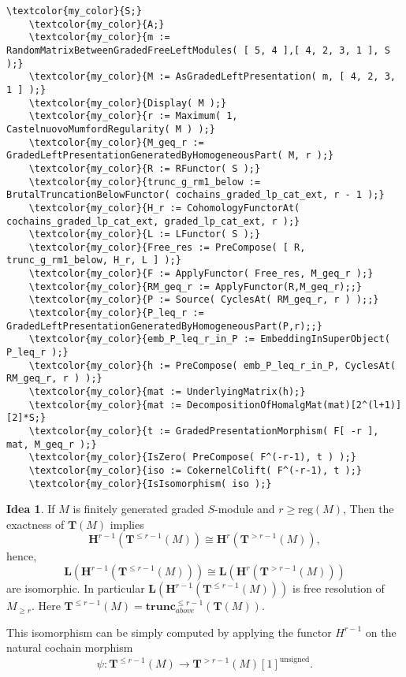 \documentclass[16pt,a4paper]{extarticle}
\theoremstyle{definition}
\newtheorem{idea}{Idea}
\theoremstyle{theorem}
\newcommand{\LL}{\mathbf{L}}
\newcommand{\HH}{\mathbf{H}}
\newcommand{\TT}{\mathbf{T}}
\newcommand{\trunc}{\mathbf{trunc}}
\begin{document}
\begin{Verbatim}[commandchars=\\\{\}, fontseries=b, frame=single, label=Gap Code, framerule=0.5mm, rulecolor=\color{rule_color}]
    \textcolor{my_color}{S;}
    \textcolor{my_color}{A;}
    \textcolor{my_color}{m := RandomMatrixBetweenGradedFreeLeftModules( [ 5, 4 ],[ 4, 2, 3, 1 ], S );}
    \textcolor{my_color}{M := AsGradedLeftPresentation( m, [ 4, 2, 3, 1 ] );}
    \textcolor{my_color}{Display( M );}
    \textcolor{my_color}{r := Maximum( 1, CastelnuovoMumfordRegularity( M ) );}
    \textcolor{my_color}{M_geq_r := GradedLeftPresentationGeneratedByHomogeneousPart( M, r );}
    \textcolor{my_color}{R := RFunctor( S );}
    \textcolor{my_color}{trunc_g_rm1_below := BrutalTruncationBelowFunctor( cochains_graded_lp_cat_ext, r - 1 );}
    \textcolor{my_color}{H_r := CohomologyFunctorAt( cochains_graded_lp_cat_ext, graded_lp_cat_ext, r );}
    \textcolor{my_color}{L := LFunctor( S );}
    \textcolor{my_color}{Free_res := PreCompose( [ R, trunc_g_rm1_below, H_r, L ] );}
    \textcolor{my_color}{F := ApplyFunctor( Free_res, M_geq_r );}
    \textcolor{my_color}{RM_geq_r := ApplyFunctor(R,M_geq_r);;}
    \textcolor{my_color}{P := Source( CyclesAt( RM_geq_r, r ) );;}
    \textcolor{my_color}{P_leq_r := GradedLeftPresentationGeneratedByHomogeneousPart(P,r);;}
    \textcolor{my_color}{emb_P_leq_r_in_P := EmbeddingInSuperObject( P_leq_r );}
    \textcolor{my_color}{h := PreCompose( emb_P_leq_r_in_P, CyclesAt( RM_geq_r, r ) );}
    \textcolor{my_color}{mat := UnderlyingMatrix(h);}
    \textcolor{my_color}{mat := DecompositionOfHomalgMat(mat)[2^(l+1)][2]*S;}
    \textcolor{my_color}{t := GradedPresentationMorphism( F[ -r ], mat, M_geq_r );}
    \textcolor{my_color}{IsZero( PreCompose( F^(-r-1), t ) );}
    \textcolor{my_color}{iso := CokernelColift( F^(-r-1), t );}
    \textcolor{my_color}{IsIsomorphism( iso );}
\end{Verbatim}
    
\begin{idea}
    If $M$ is finitely generated graded $S$-module and $r\geq\mathrm{reg}(M)$, Then the exactness of $\TT(M)$ implies
    $$\HH^{r-1}( \TT^{\leq r-1}(M)) \cong \HH^r( \TT^{> r-1}(M)),$$ hence, 
    $$\LL(\HH^{r-1}( \TT^{\leq r-1}(M)) ) \cong  \LL(\HH^r( \TT^{> r-1}(M)) )$$ are isomorphic. In particular 
    $\LL(\HH^{r-1}( \TT^{\leq r-1}(M)) )$ is free resolution of $M_{\geq r}$.
    Here $\TT^{\leq r-1}(M) = \trunc^{\leq r-1}_{above}(\TT(M))$.

    This isomorphism can be simply computed by applying the functor $H^{r-1}$ on the 
    natural cochain morphism 
    $$\psi: \TT^{\leq r-1}(M)\rightarrow \TT^{> r-1}(M)[1]^{\mathrm{unsigned}}.$$
    
\end{idea}
\end{document}
